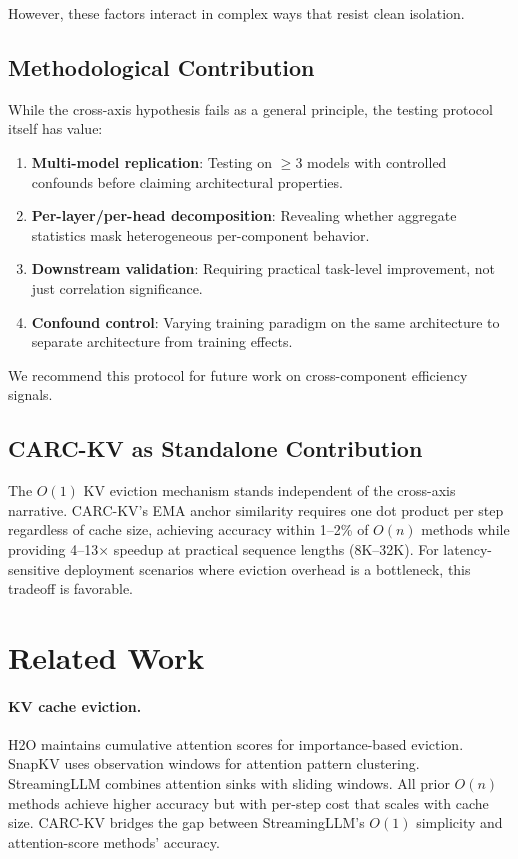 \documentclass[11pt]{article}
\begin{document}
However, these factors interact in complex ways that resist clean isolation.

\subsection{Methodological Contribution}

While the cross-axis hypothesis fails as a general principle, the testing protocol itself has value:
\begin{enumerate}
    \item \textbf{Multi-model replication}: Testing on $\geq$3 models with controlled confounds before claiming architectural properties.
    \item \textbf{Per-layer/per-head decomposition}: Revealing whether aggregate statistics mask heterogeneous per-component behavior.
    \item \textbf{Downstream validation}: Requiring practical task-level improvement, not just correlation significance.
    \item \textbf{Confound control}: Varying training paradigm on the same architecture to separate architecture from training effects.
\end{enumerate}

We recommend this protocol for future work on cross-component efficiency signals.

\subsection{CARC-KV as Standalone Contribution}

The $O(1)$ KV eviction mechanism stands independent of the cross-axis narrative. CARC-KV's EMA anchor similarity requires one dot product per step regardless of cache size, achieving accuracy within 1--2\% of $O(n)$ methods while providing 4--13$\times$ speedup at practical sequence lengths (8K--32K). For latency-sensitive deployment scenarios where eviction overhead is a bottleneck, this tradeoff is favorable.

\section{Related Work}

\paragraph{KV cache eviction.} H2O \citep{zhang2023h2o} maintains cumulative attention scores for importance-based eviction. SnapKV \citep{li2024snapkv} uses observation windows for attention pattern clustering. StreamingLLM \citep{xiao2024streamingllm} combines attention sinks with sliding windows. All prior $O(n)$ methods achieve higher accuracy but with per-step cost that scales with cache size. CARC-KV bridges the gap between StreamingLLM's $O(1)$ simplicity and attention-score methods' accuracy.
\end{document}
